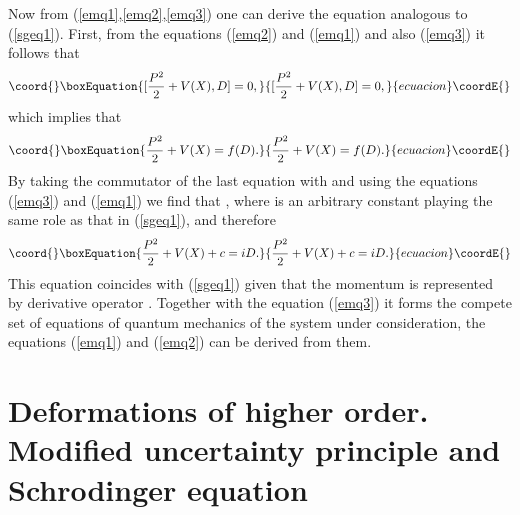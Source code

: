 \documentclass[a4paper,11pt]{article}
\begin{document}
Now from (\ref{emq1},\ref{emq2},\ref{emq3}) one can derive the
equation analogous to (\ref{sgeq1}). First, from the equations
(\ref{emq2}) and (\ref{emq1}) and also (\ref{emq3}) it follows
that
\begin{equation}\coord{}\boxEquation{
[\frac{P^2}{2}+V(X),D]=0, \label{enco}
}{
[\frac{P^2}{2}+V(X),D]=0, }{ecuacion}\coordE{}\end{equation}
which implies that
\begin{equation}\coord{}\boxEquation{
\frac{P^2}{2}+V(X)=f(D).
}{
\frac{P^2}{2}+V(X)=f(D).
}{ecuacion}\coordE{}\end{equation}
By taking the commutator of the last equation with \coordHE{} and using
the equations (\ref{emq3}) and (\ref{emq1}) we find that
\coordHE{}, where \coordHE{} is an arbitrary constant playing the same
role as that in (\ref{sgeq1}), and therefore
\begin{equation}\coord{}\boxEquation{
\frac{P^2}{2}+V(X)+c=iD. \label{sgeq2}
}{
\frac{P^2}{2}+V(X)+c=iD. }{ecuacion}\coordE{}\end{equation}
This equation coincides with (\ref{sgeq1}) given that the momentum
is represented by derivative operator \coordHE{}. Together
with the equation (\ref{emq3}) it forms the compete set of
equations of quantum mechanics of the system under consideration,
the equations (\ref{emq1}) and (\ref{emq2}) can be derived from
them.


\section{Deformations of higher order. Modified uncertainty principle and Schrodinger equation  }
\label{sec4}
\end{document}
